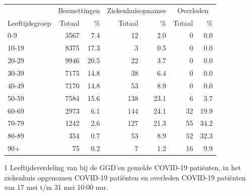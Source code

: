 \documentclass[
  english,
  man,floatsintext]{apa6}
\begin{document}
\begin{table}
\centering\begingroup\fontsize{11}{13}\selectfont

\begin{threeparttable}
\begin{tabular}{lrrrrrr}
\toprule
\multicolumn{1}{c}{ } & \multicolumn{2}{c}{Besmettingen} & \multicolumn{2}{c}{Ziekenhuisopnames} & \multicolumn{2}{c}{Overleden} \\
\cmidrule(l{3pt}r{3pt}){2-3} \cmidrule(l{3pt}r{3pt}){4-5} \cmidrule(l{3pt}r{3pt}){6-7}
Leeftijdsgroep & Totaal & \% & Totaal & \% & Totaal & \%\\
\midrule
0-9 & 3567 & 7.4 & 12 & 2.0 & 0 & 0.0\\
10-19 & 8375 & 17.3 & 3 & 0.5 & 0 & 0.0\\
20-29 & 9946 & 20.5 & 22 & 3.7 & 0 & 0.0\\
30-39 & 7175 & 14.8 & 38 & 6.4 & 0 & 0.0\\
40-49 & 7170 & 14.8 & 53 & 8.9 & 0 & 0.0\\
50-59 & 7584 & 15.6 & 138 & 23.1 & 6 & 3.7\\
60-69 & 2973 & 6.1 & 144 & 24.1 & 32 & 19.9\\
70-79 & 1242 & 2.6 & 127 & 21.3 & 55 & 34.2\\
80-89 & 354 & 0.7 & 53 & 8.9 & 52 & 32.3\\
90+ & 75 & 0.2 & 7 & 1.2 & 16 & 9.9\\
\bottomrule
\end{tabular}
\begin{tablenotes}
\item[1] Leeftijdsverdeling van bij de GGD’en gemelde COVID-19 patiënten, in het ziekenhuis opgenomen COVID-19 patiënten en overleden COVID-19 patiënten van 17 mei t/m 31 mei 10:00 uur.
\end{tablenotes}
\end{threeparttable}
\endgroup{}
\end{table}

\newpage
\end{document}
